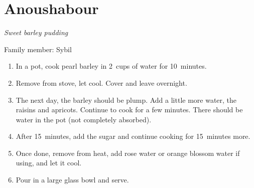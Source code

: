 \chapter{Anoushabour}
\label{ch:anoushabour}



\textit{Sweet barley pudding}

Family member: Sybil

\begin{enumerate}
    \item In a pot, cook pearl barley in 2~cups of water for 10~minutes.
    \item Remove from stove, let cool. Cover and leave overnight.
    \item The next day, the barley should be plump. Add a little more water, the raisins and apricots. Continue to cook for a few minutes. There should be water in the pot (not completely absorbed).
    \item After 15~minutes, add the sugar and continue cooking for 15~minutes more.
    \item Once done, remove from heat, add rose water or orange blossom water if using, and let it cool.
    \item Pour in a large glass bowl and serve.
\end{enumerate}
